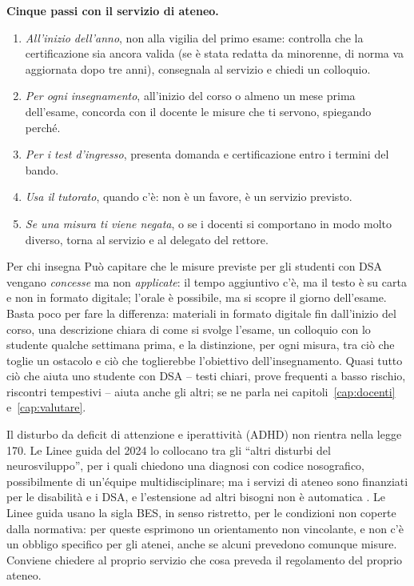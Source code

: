 \begin{inpratica}
\textbf{Cinque passi con il servizio di ateneo.}
\begin{enumerate}
  \item \emph{All'inizio dell'anno}, non alla vigilia del primo esame:
        controlla che la certificazione sia ancora valida (se è stata redatta da minorenne, di norma va aggiornata dopo tre anni), consegnala al servizio e chiedi un colloquio.
  \item \emph{Per ogni insegnamento}, all'inizio del corso o almeno un
        mese prima dell'esame, concorda con il docente le misure che ti
        servono, spiegando perché.
  \item \emph{Per i test d'ingresso}, presenta domanda e certificazione
        entro i termini del bando.
  \item \emph{Usa il tutorato}, quando c'è: non è un favore, è un
        servizio previsto.
  \item \emph{Se una misura ti viene negata}, o se i docenti si
        comportano in modo molto diverso, torna al servizio e al
        delegato del rettore.
\end{enumerate}
\end{inpratica}

\begin{riquadro}{Per chi insegna}
Può capitare che le misure previste per gli studenti con DSA vengano \emph{concesse} ma non \emph{applicate}: il tempo aggiuntivo c'è, ma il
testo è su carta e non in formato digitale; l'orale è possibile, ma si
scopre il giorno dell'esame. Basta poco per fare la differenza:
materiali in formato digitale fin dall'inizio del corso, una
descrizione chiara di come si svolge l'esame, un colloquio con lo
studente qualche settimana prima, e la distinzione, per ogni misura,
tra ciò che toglie un ostacolo e ciò che toglierebbe l'obiettivo
dell'insegnamento. Quasi tutto ciò che aiuta uno studente con DSA --
testi chiari, prove frequenti a basso rischio, riscontri tempestivi --
aiuta anche gli altri; se ne parla nei capitoli~\ref{cap:docenti}
e~\ref{cap:valutare}.
\end{riquadro}

Il disturbo da deficit di attenzione e iperattività (ADHD) non rientra
nella legge 170. Le Linee guida del 2024 lo collocano tra gli
\enquote{altri disturbi del neurosviluppo}, per i quali chiedono una
diagnosi con codice nosografico, possibilmente di un'équipe
multidisciplinare; ma i servizi di ateneo sono finanziati per le disabilità e i DSA, e l'estensione ad altri bisogni non è automatica \parencite{cnudd2024}. Le Linee guida usano la sigla BES, in senso ristretto, per le condizioni non coperte dalla normativa: per queste esprimono un orientamento non vincolante, e non c'è un obbligo specifico per gli atenei, anche se alcuni prevedono comunque misure. Conviene chiedere al proprio servizio che cosa
preveda il regolamento del proprio ateneo.

